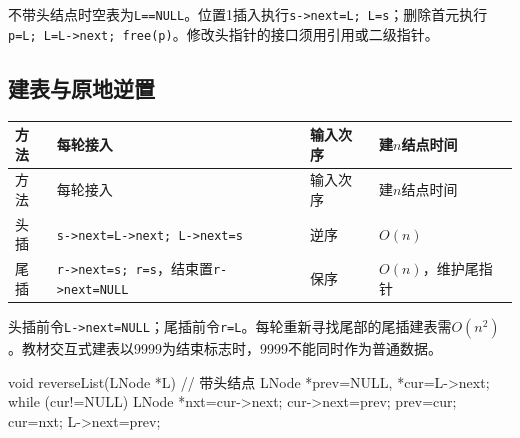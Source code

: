 不带头结点时空表为\texttt{L=\allowbreak{}=\allowbreak{}NULL}。位置1插入执行\texttt{s->\allowbreak{}next=\allowbreak{}L;\allowbreak{} L=\allowbreak{}s}；删除首元执行\texttt{p=\allowbreak{}L;\allowbreak{} L=\allowbreak{}L->\allowbreak{}next;\allowbreak{} free(\allowbreak{}p)\allowbreak{}}。修改头指针的接口须用引用或二级指针。

\subsection{建表与原地逆置}\label{DS02-build}

\par\smallskip
\begin{wideblock}
{\fontsize{9.3}{12}\selectfont\setlength{\tabcolsep}{2.5pt}\setlength{\LTleft}{0pt}\setlength{\LTright}{0pt}
\begin{longtable}{@{}>{\raggedright\arraybackslash}p{}>{\raggedright\arraybackslash}p{}>{\raggedright\arraybackslash}p{}>{\raggedright\arraybackslash}p{}@{}}
\toprule
方法 & 每轮接入 & 输入次序 & 建\(n\)结点时间 \\

\midrule\endfirsthead\toprule
方法 & 每轮接入 & 输入次序 & 建\(n\)结点时间 \\

\midrule\endhead\bottomrule\endfoot
头插 & \texttt{s-\textgreater{}next=L-\textgreater{}next;\ L-\textgreater{}next=s} & 逆序 & \(O(n)\) \\

尾插 & \texttt{r-\textgreater{}next=s;\ r=s}，结束置\texttt{r-\textgreater{}next=NULL} & 保序 & \(O(n)\)，维护尾指针 \\

\end{longtable}}
\end{wideblock}
\par\smallskip

头插前令\texttt{L->\allowbreak{}next=\allowbreak{}NULL}；尾插前令\texttt{r=\allowbreak{}L}。每轮重新寻找尾部的尾插建表需\(O(n^2)\)。教材交互式建表以9999为结束标志时，9999不能同时作为普通数据。

\par\smallskip\noindent\begin{minipage}{\linewidth}
\begin{codeblock}[language={C}]
void reverseList(LNode *L) {       // 带头结点
    LNode *prev=NULL, *cur=L->next;
    while (cur!=NULL) {
        LNode *nxt=cur->next;
        cur->next=prev;
        prev=cur;
        cur=nxt;
    }
    L->next=prev;
}
\end{codeblock}
\end{minipage}\par\smallskip

